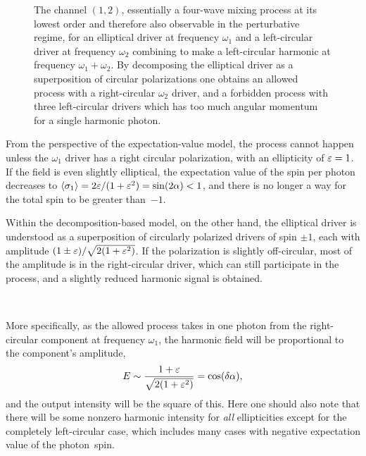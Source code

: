 \begin{figure}[ht]
  \centering
  
  
  \vspace{3mm}
  \caption[
  Feynman diagram for the $(1,2)$ channel in bicircular HHG with one elliptical and one circular driver
  ]{
  The channel $(1,2)$, essentially a four-wave mixing process at its lowest order and therefore also observable in the perturbative regime, for an elliptical driver at frequency $\omega_1$ and a left-circular driver at frequency $\omega_2$ combining to make a left-circular harmonic at frequency $\omega_1+\omega_2$. By decomposing the elliptical driver as a superposition of circular polarizations one obtains an allowed process with a right-circular $\omega_2$ driver, and a forbidden process with three left-circular drivers which has too much angular momentum for a single harmonic photon.
  }
\label{f8-four-wave-mixing-diagram}
\end{figure}






From the perspective of the expectation-value model, the process cannot happen unless the $\omega_1$ driver has a right circular polarization, with an ellipticity of $\varepsilon=1$. If the field is even slightly elliptical, the expectation value of the spin per photon decreases to $\langle\sigma_1\rangle  =2\varepsilon/(1+\varepsilon^2) =\sin(2\alpha) <1$, and there is no longer a way for the total spin to be greater than~$-1$.

Within the decomposition-based model, on the other hand, the elliptical driver is understood as a superposition of circularly polarized drivers of spin $\pm1$, each with amplitude $(1\pm\varepsilon)/\sqrt{2(1+\varepsilon^2)}$. If the polarization is slightly off-circular, most of the amplitude is in the right-circular driver, which can still participate in the process, and a slightly reduced harmonic signal is obtained. 

$\quad$

More specifically, as the allowed process takes in one photon from the right-circular component at frequency $\omega_1$, the harmonic field will be proportional to the component's amplitude,
\begin{equation}
E\sim\frac{1+\varepsilon}{\sqrt{2(1+\varepsilon^2)}}=\cos(\delta\alpha),
\end{equation}
and the output intensity will be the square of this. Here one should also note that there will be some nonzero harmonic intensity for \textit{all} ellipticities except for the completely left-circular case, which includes many cases with negative expectation value of the \mbox{photon spin}.




